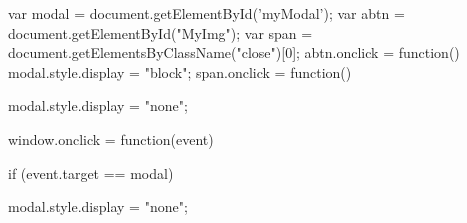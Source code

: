 var modal = document.getElementById('myModal');
			var abtn = document.getElementById("MyImg");
			var span = document.getElementsByClassName("close")[0];
			abtn.onclick = function() {
				modal.style.display = "block";
			}
			span.onclick = function() {
				modal.style.display = "none";
				
			}
			
			
			
			
			
window.onclick = function(event) {
				if (event.target == modal) {
					modal.style.display = "none";
					
				}
				
			}
